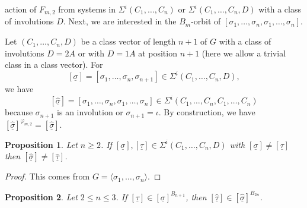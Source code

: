 \documentclass[12pt,a4paper]{article}
\newtheorem{proposition}{Proposition}[section]
\numberwithin{equation}{section}
\numberwithin{table}{section}
\begin{document}
action of $F_{m,2}$ from systems in $\Sigma^i(C_1,\dots,C_n)$ or $\Sigma^i(C_1,\dots,C_n,D)$ with
a class of involutions $D$.
Next, we are interested in the $B_m$-orbit of $[\sigma_1, \dots, \sigma_n, \sigma_1, \dots, \sigma_n]$.
\par
\noindent
Let $(C_1,\dots,C_n,D)$ be a class vector of length $n+1$ of $G$ with a class of
involutions $D=2A$ or with $D=1A$ at position $n+1$ (here we allow a trivial class in a class vector).
For 
$$[\underline{\sigma}] = [\sigma_1, \dots, \sigma_n, \sigma_{n+1}] \in \Sigma^i(C_1,\dots,C_n,D),$$ 
we have
$$[\widehat{\underline{\sigma}}] = [\sigma_1, \dots, \sigma_n, \sigma_1, \dots, \sigma_n] \in \Sigma^i(C_1,\dots,C_n,C_1,\dots,C_n)$$
because $\sigma_{n+1}$ is an involution or $\sigma_{n+1} = \iota$.
By construction, we have $[\widehat{\underline{\sigma}}]^{\varphi_{m,2}} = [\widehat{\underline{\sigma}}]$.
%
\begin{proposition}
\label{TransformedObjectsDifferent}
Let $n \geq 2$.
If $[\underline{\sigma}], [\underline{\tau}] \in \Sigma^i(C_1,\dots,C_n,D)$
with $[\underline{\sigma}] \neq [\underline{\tau}]$ then 
$[\widehat{\underline{\sigma}}] \neq [\widehat{\underline{\tau}}]$.
\end{proposition}
\begin{proof}
This comes from $G = \langle \sigma_1, \dots, \sigma_n \rangle$.
\end{proof}
%
\begin{proposition}
\label{TransformationOfOrbits}
Let $2 \leq n \leq 3$.
If $[\underline{\tau}] \in [\underline{\sigma}]^{B_{n+1}}$, then 
$[\widehat{\underline{\tau}}] \in [\widehat{\underline{\sigma}}]^{B_{2n}}$.
\end{proposition}
\end{document}
